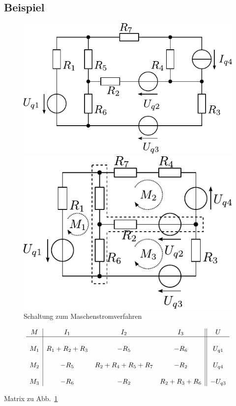 \newpage

\subsection{Beispiel}
\begin{figure}[h!]
\centering
\includegraphics[scale=\schscale]{mastro_sch.pdf}

\vspace{5mm}

\includegraphics[scale=\schscale]{mastro_sch_2.pdf}
\caption{Schaltung zum Maschenstromverfahren}
\label{sch:mastro}
\end{figure}

\begin{table}[h!]
\footnotesize
\[ \begin{array}{c|ccc||c}

M	& I_1 & I_2 & I_3 & U \\
\hline &&&& \\
M_1 	& R_1 + R_2 + R_3 	& -R_5 				& -R_6 			& U_{q1} \\
&&&& \\
M_2 	& -R_5 			& R_2 + R_4 + R_5 + R_7 	& -R_2 			& U_{q4} \\
&&&& \\
M_3 	& -R_6 			& -R_2 				& R_2 + R_3 + R_6 	& -U_{q3} \\
\end{array}
\]
\normalsize
\caption{Matrix zu Abb.~\ref{sch:mastro}}
\end{table}
